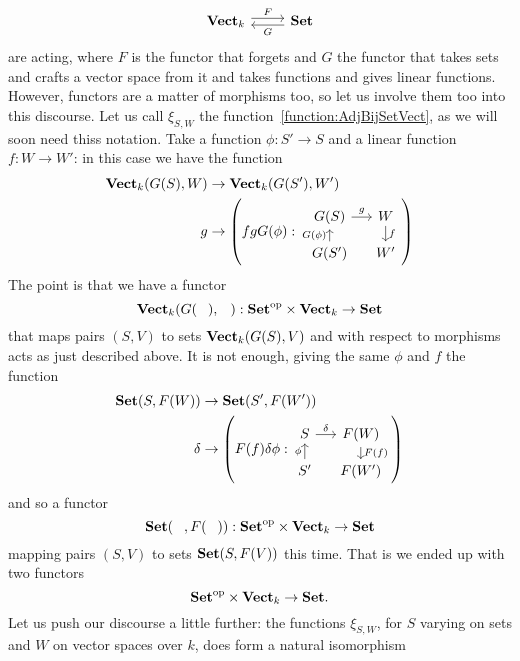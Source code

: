 \begin{example}
\[\begin{tikzcd}
\Vect_k \ar["F", r, shift left] & \Set \ar["G", l, shift left]
\end{tikzcd}\]
are acting, where \(F\) is the functor that forgets and \(G\) the functor that takes sets and crafts a vector space from it and takes functions and gives linear functions.  However, functors are a matter of morphisms too, so let us involve them too into this discourse. Let us call \(\xi_{S,W}\) the function~\eqref{function:AdjBijSetVect}, as we will soon need thiss notation.\newline
Take a function \(\phi : S' \to S\) and a linear function \(f : W \to W'\): in this case we have the function
\[\begin{aligned}
\Vect_k(G(S), W) & \to \Vect_k(G(S'), W') \\
g &\to \left(fgG(\phi) : \begin{tikzcd}[row sep=small, column sep=small, ampersand replacement=\&]
G(S) \ar["g", r] \& W \ar["f", d] \\
G(S') \ar["G(\phi)", u] \& W'
\end{tikzcd}\right)
\end{aligned}\]
The point is that we have a functor
\[\Vect_k(G(\void), \void) : \op\Set \times \Vect_k \to \Set\]
that maps pairs \((S, V)\) to sets \(\mathbf{Vect}_k(G(S), V)\) and with respect to morphisms acts as just described above. It is not enough, giving the same \(\phi\) and \(f\) the function
\[\begin{aligned}
\Set(S, F(W)) & \to \Set(S', F(W')) \\
\delta &\to \left(F(f)\delta\phi : \begin{tikzcd}[row sep=small, column sep=small, ampersand replacement=\&]
S \ar["\delta", r] \& F(W) \ar["F(f)", d] \\
S' \ar["\phi", u] \& F(W')
\end{tikzcd}\right)
\end{aligned}\]
and so a functor
\[\Set(\void, F(\void)) : \op\Set \times \Vect_k \to \Set\]
mapping pairs \((S, V)\) to sets \(\mathbf{Set}(S, F(V))\) this time. That is we ended up with two functors
\[\mathbf{Set}^\text{op} \times \mathbf{Vect}_k \to \mathbf{Set} .\]
Let us push our discourse a little further: the functions \(\xi_{S, W}\), for \(S\) varying on sets and \(W\) on vector spaces over \(k\), does form a natural isomorphism

\end{example}
